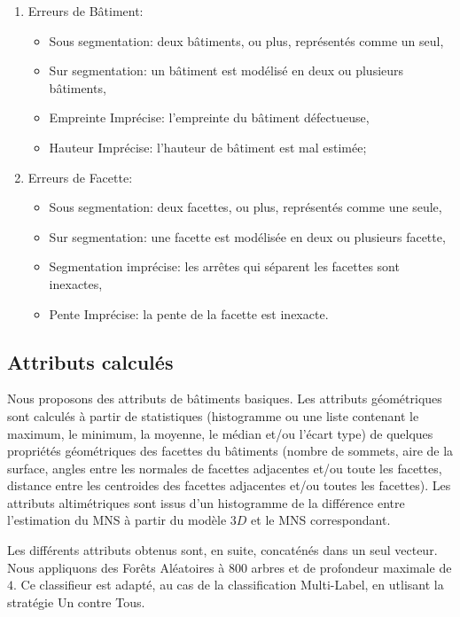 \documentclass[a4paper,french]{article}
\begin{document}
    \begin{enumerate}[label= (\roman*)., itemsep=0pt]
        \item Erreurs de Bâtiment:
        \begin{itemize}[itemsep=0pt]
            \item Sous segmentation: deux bâtiments, ou plus, représentés comme un seul,
            \item Sur segmentation: un bâtiment est modélisé en deux ou plusieurs bâtiments,
            \item Empreinte Imprécise: l'empreinte du bâtiment défectueuse,
            \item Hauteur Imprécise: l'hauteur de bâtiment est mal estimée;
        \end{itemize}
        \item Erreurs de Facette:
        \begin{itemize}[itemsep=0pt]
            \item Sous segmentation: deux facettes, ou plus, représentés comme une seule,
            \item Sur segmentation: une facette est modélisée en deux ou plusieurs facette,
            \item Segmentation imprécise: les arrêtes qui séparent les facettes sont inexactes,
            \item Pente Imprécise: la pente de la facette est inexacte.
        \end{itemize}
    \end{enumerate}

    \subsection{Attributs calculés}

    Nous proposons des attributs de bâtiments basiques. Les attributs géométriques sont calculés à partir de statistiques (histogramme ou une liste contenant le maximum, le minimum, la moyenne, le médian et/ou l'écart type) de quelques propriétés géométriques des facettes du bâtiments (nombre de sommets, aire de la surface, angles entre les normales de facettes adjacentes et/ou toute les facettes, distance entre les centroides des facettes adjacentes et/ou toutes les facettes). Les attributs altimétriques sont issus d'un histogramme de la différence entre l'estimation du MNS à partir du modèle $3D$ et le MNS correspondant.

    Les différents attributs obtenus sont, en suite, concaténés dans un seul vecteur. Nous appliquons des Forêts Aléatoires à $800$ arbres et de profondeur maximale de $4$. Ce classifieur est adapté, au cas de la classification Multi-Label, en utlisant la stratégie Un contre Tous.
\end{document}
